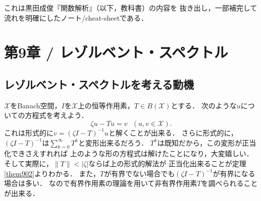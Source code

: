 \documentclass[a4j]{jsarticle}
\newcommand{\spX}{\mathscr{X}}
\begin{document}
    これは黒田成俊『関数解析』（以下，教科書）の内容を
    抜き出し，一部補完して流れを明確にしたノート/cheat-sheetである．

\section{第9章 / レゾルベント・スペクトル}
    \subsection{レゾルベント・スペクトルを考える動機}
        $\spX$をBanach空間，$I$を$\spX$上の恒等作用素，$T \in B(\spX)$とする．
        次のような$u$についての方程式を考えよう．
        \[ \zeta u-Tu=v ~~~(u,v \in \spX). \label{eq905}\]
        これは形式的に$v=(\zeta I-T)^{-1} u$と解くことが出来る．
        さらに形式的に，$(\zeta I-T)^{-1}$は$\sum_{k=0}^{\infty}T^k$と変形出来るだろう．
        $T^k$は既知だから，この変形が正当化できさえすれれば
        上のような形の方程式は解けたことになり，大変嬉しい．
        そして実際に，$\|T\|<|\zeta|$ならば上の形式的解法が
        正当化出来ることが定理\ref{them902}よりわかる．
        また，$T$が有界でない場合でも$(\zeta I-T)^{-1}$が有界になる場合は多い．
        なので有界作用素の理論を用いて非有界作用素$T$を調べられることが出来る．
\end{document}
